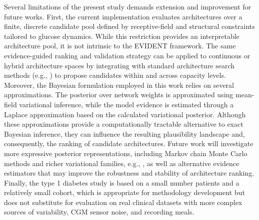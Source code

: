 \documentclass[preprint,12pt]{elsarticle}
\begin{document}
Several limitations of the present study demands extension and improvement for future works. 
%
First, the current implementation evaluates architectures over a finite, discrete candidate pool defined by receptive-field and structural constraints tailored to glucose dynamics. While this restriction provides an interpretable architecture pool, it is not intrinsic to the EVIDENT framework. The same evidence-guided ranking and validation strategy can be applied to continuous or hybrid architecture spaces by integrating with standard architecture search methods (e.g., \cite{optuna_2019, elsken2019neural}) to propose candidates within and across capacity levels. 
%
Moreover, the Bayesian formulation employed in this work relies on several approximations. The posterior over network weights is approximated using mean-field variational inference, while the model evidence is estimated through a Laplace approximation based on the calculated variational posterior. Although these approximations provide a computationally tractable alternative to exact Bayesian inference, they can influence the resulting plausibility landscape and, consequently, the ranking of candidate architectures. Future work will investigate more expressive posterior representations, including Markov chain Monte Carlo methods and richer variational families, e.g., \cite{psaros2023uncertainty}, as well as alternative evidence estimators that may improve the robustness and stability of architecture ranking.
%
Finally, the type 1 diabetes study is based on a small number patients and a relatively small cohort, which is appropriate for methodology development but does not substitute for evaluation on real clinical datasets with more complex sources of variability, CGM sensor noise, and recording meals. 



\end{document}
